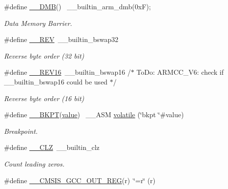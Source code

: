 \begin{DoxyCompactItemize}
\#define \hyperlink{group___c_m_s_i_s___core___instruction_interface_gabeb8c1cd807c7acde4c13cf451340350}{\+\_\+\+\_\+\+D\+MB}()            ~\+\_\+\+\_\+builtin\+\_\+arm\+\_\+dmb(0x\+F);
\begin{DoxyCompactList}\small\item\em Data Memory Barrier. \end{DoxyCompactList}\item 
\#define \hyperlink{group___c_m_s_i_s___core___instruction_interface_ga14f54807872c0f5e05604c4924abfdae}{\+\_\+\+\_\+\+R\+EV}~\+\_\+\+\_\+builtin\+\_\+bswap32
\begin{DoxyCompactList}\small\item\em Reverse byte order (32 bit) \end{DoxyCompactList}\item 
\#define \hyperlink{group___c_m_s_i_s___core___instruction_interface_ga4e3acd41e7667cdf65ffcd8c76a8613f}{\+\_\+\+\_\+\+R\+E\+V16}~\+\_\+\+\_\+builtin\+\_\+bswap16                           /$\ast$ To\+Do\+:  A\+R\+M\+C\+C\+\_\+\+V6\+: check if \+\_\+\+\_\+builtin\+\_\+bswap16 could be used $\ast$/
\begin{DoxyCompactList}\small\item\em Reverse byte order (16 bit) \end{DoxyCompactList}\item 
\#define \hyperlink{group___c_m_s_i_s___core___instruction_interface_gaefbccd3648c75a5ce8362e4eae1671b9}{\+\_\+\+\_\+\+B\+K\+PT}(\hyperlink{semihosting_8h_aacce635d68067370c70caa2381ea1040}{value})                                          ~\+\_\+\+\_\+\+A\+SM \hyperlink{semihosting_8h_a3cac76ac70d3a0c44792887ffb7f04ec}{volatile} (\char`\"{}bkpt \char`\"{}\#value)
\begin{DoxyCompactList}\small\item\em Breakpoint. \end{DoxyCompactList}\item 
\#define \hyperlink{group___c_m_s_i_s___core___instruction_interface_ga5d5bb1527e042be4a9fa5a33f65cc248}{\+\_\+\+\_\+\+C\+LZ}~\+\_\+\+\_\+builtin\+\_\+clz
\begin{DoxyCompactList}\small\item\em Count leading zeros. \end{DoxyCompactList}\item 
\#define \hyperlink{group___c_m_s_i_s___core___instruction_interface_gabc17e391c13c71702366c67cba39c276}{\+\_\+\+\_\+\+C\+M\+S\+I\+S\+\_\+\+G\+C\+C\+\_\+\+O\+U\+T\+\_\+\+R\+EG}(r)~\char`\"{}=r\char`\"{} (r)

\end{DoxyCompactItemize}
